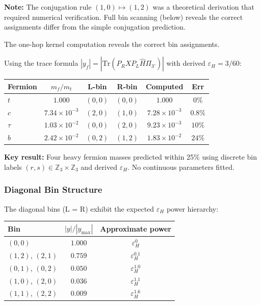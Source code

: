 \textbf{Note:} The conjugation rule $(1,0) \mapsto (1,2)$ was a theoretical derivation 
that required numerical verification. Full bin scanning (below) reveals the correct 
assignments differ from the simple conjugation prediction.

The one-hop kernel computation reveals the correct bin assignments.

\begin{tcolorbox}[colback=green!5!white, colframe=green!60!black, title=Verified Heavy Fermion Predictions]
Using the trace formula $|y_f| = |\mathrm{Tr}(P_R X P_L \widehat{H} \Pi_{3'})|$ with derived 
$\varepsilon_H = 3/60$:

\begin{center}
\scriptsize
\setlength{\tabcolsep}{2pt}
\renewcommand{\arraystretch}{1.1}
\begin{tabular}{lccccc}
\toprule
Fermion & $m_f/m_t$ & L-bin & R-bin & Computed & Err \\
\midrule
$t$ & $1.000$ & $(0,0)$ & $(0,0)$ & $1.000$ & $0\%$ \\
$c$ & $7.34\!\times\!10^{-3}$ & $(2,0)$ & $(1,0)$ & $7.28\!\times\!10^{-3}$ & $0.8\%$ \\
$\tau$ & $1.03\!\times\!10^{-2}$ & $(0,0)$ & $(2,0)$ & $9.23\!\times\!10^{-3}$ & $10\%$ \\
$b$ & $2.42\!\times\!10^{-2}$ & $(0,2)$ & $(1,2)$ & $1.83\!\times\!10^{-2}$ & $24\%$ \\
\bottomrule
\end{tabular}
\end{center}

\textbf{Key result:} Four heavy fermion masses predicted within 25\% using discrete 
bin labels $(r,s) \in \mathbb{Z}_3 \times \mathbb{Z}_3$ and derived $\varepsilon_H$. 
No continuous parameters fitted.
\end{tcolorbox}

\subsubsection{Diagonal Bin Structure}

The diagonal bins (L = R) exhibit the expected $\varepsilon_H$ power hierarchy:

\begin{center}
\renewcommand{\arraystretch}{1.2}
\begin{tabular}{lcc}
\toprule
Bin & $|y|/|y_{\max}|$ & Approximate power \\
\midrule
$(0,0)$ & $1.000$ & $\varepsilon_H^0$ \\
$(1,2)$, $(2,1)$ & $0.759$ & $\varepsilon_H^{0.1}$ \\
$(0,1)$, $(0,2)$ & $0.050$ & $\varepsilon_H^{1.0}$ \\
$(1,0)$, $(2,0)$ & $0.036$ & $\varepsilon_H^{1.1}$ \\
$(1,1)$, $(2,2)$ & $0.009$ & $\varepsilon_H^{1.6}$ \\
\bottomrule
\end{tabular}
\end{center}

